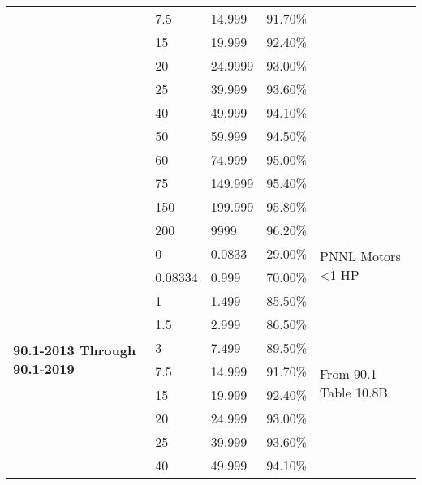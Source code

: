 \begin{table}[]
\begin{tabular}{|p{1.4cm}|p{1.5cm}|p{1.5cm}|p{1.5cm}|p{2cm}|}
 & 7.5     & 14.999  & 91.70\% &                                           \\ \cline{2-4}
 & 15      & 19.999  & 92.40\% &                                           \\ \cline{2-4}
 & 20      & 24.9999 & 93.00\% &                                           \\ \cline{2-4}
 & 25      & 39.999  & 93.60\% &                                           \\ \cline{2-4}
 & 40      & 49.999  & 94.10\% &                                           \\ \cline{2-4}
 & 50      & 59.999  & 94.50\% &                                           \\ \cline{2-4}
 & 60      & 74.999  & 95.00\% &                                           \\ \cline{2-4}
 & 75      & 149.999 & 95.40\% &                                           \\ \cline{2-4}
 & 150     & 199.999 & 95.80\% &                                           \\ \cline{2-4}
 & 200     & 9999    & 96.20\% &                                           \\ \cline{1-4} \cline{5-5} 
\multirow{17}{*}{\parbox{1.4cm}{\textbf{90.1-2013 Through 90.1-2019}}}
 & 0       &  0.0833 & 29.00\% &  \multirow{2}{*}{PNNL Motors \textless 1 HP} \\ \cline{2-4}
 & 0.08334 & 0.999   & 70.00\% &                                             \\ \cline{2-4} \cline{5-5} 
 & 1       & 1.499   & 85.50\% & \multirow{15}{*}{\parbox{2cm}{From 90.1 Table 10.8B}} \\ \cline{2-4}
 & 1.5     & 2.999   & 86.50\% &                                           \\ \cline{2-4}
 & 3       & 7.499   & 89.50\% &                                           \\ \cline{2-4}
 & 7.5     & 14.999  & 91.70\% &                                           \\ \cline{2-4}
 & 15      & 19.999  & 92.40\% &                                           \\ \cline{2-4}
 & 20      & 24.999  & 93.00\% &                                           \\ \cline{2-4}
 & 25      & 39.999  & 93.60\% &                                           \\ \cline{2-4}
 & 40      & 49.999  & 94.10\% &                                           \\ \cline{2-4}

\end{tabular}
\end{table}
